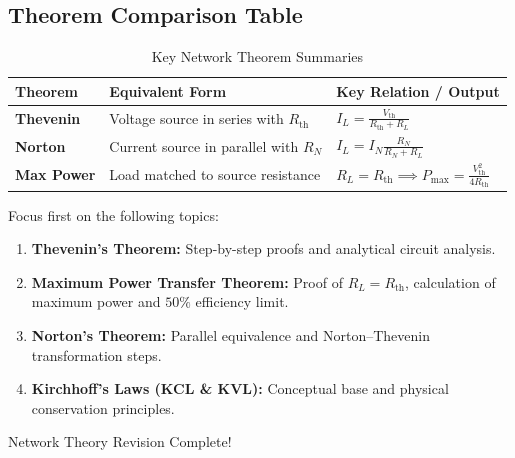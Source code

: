 \documentclass[11pt,a4paper]{article}
\begin{document}
\subsection{Theorem Comparison Table}
\begin{table}[htbp]
    \centering
    \caption{Key Network Theorem Summaries}
    \vspace{0.2cm}
    \begin{tabular}{lll}
        \toprule
        \textbf{Theorem} & \textbf{Equivalent Form} & \textbf{Key Relation / Output} \\
        \midrule
        \textbf{Thevenin} & Voltage source in series with $R_{\text{th}}$ & $I_L = \frac{V_{\text{th}}}{R_{\text{th}} + R_L}$ \\
        \textbf{Norton} & Current source in parallel with $R_N$ & $I_L = I_N \frac{R_N}{R_N + R_L}$ \\
        \textbf{Max Power} & Load matched to source resistance & $R_L = R_{\text{th}} \implies P_{\text{max}} = \frac{V_{\text{th}}^2}{4R_{\text{th}}}$ \\
        \bottomrule
    \end{tabular}
\end{table}

\newpage
\begin{prioritybox}
    Focus first on the following topics:
    \begin{enumerate}[label=\textbf{\arabic*.}]
        \item \textbf{Thevenin's Theorem:} Step-by-step proofs and analytical circuit analysis.
        \item \textbf{Maximum Power Transfer Theorem:} Proof of $R_L = R_{\text{th}}$, calculation of maximum power and $50\%$ efficiency limit.
        \item \textbf{Norton's Theorem:} Parallel equivalence and Norton--Thevenin transformation steps.
        \item \textbf{Kirchhoff's Laws (KCL \& KVL):} Conceptual base and physical conservation principles.
    \end{enumerate}
\end{prioritybox}

\begin{successbox}
    Network Theory Revision Complete! \checkmark
\end{successbox}

\newpage
\end{document}

